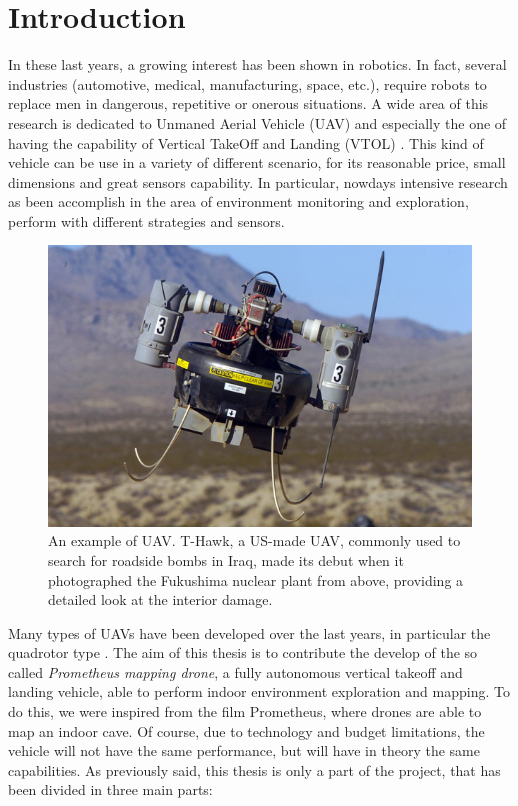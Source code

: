 \chapter{Introduction}
\label{introduction}

\renewcommand{\thepage}{\arabic{page}} 			%
\setcounter{page}{1}                   			%

In these last years, a growing interest has been shown in robotics. In fact, several industries (automotive, medical, manufacturing, space, etc.), require robots to replace men in dangerous, repetitive or onerous situations. A wide area of this research is dedicated to Unmaned Aerial Vehicle (UAV) and especially the one of having the capability of Vertical TakeOff and Landing (VTOL) \cite{largeQuadrotor}. This kind of vehicle can be use in a variety of different scenario, for its reasonable price, small dimensions and great sensors capability. In particular, nowdays intensive research as been accomplish in the area of environment monitoring and exploration, perform with different strategies and sensors.

\begin{figure}
	\includegraphics[scale=0.4]{images/fukushima.jpg}
	\caption{An example of UAV. T-Hawk, a US-made UAV, commonly used to search for roadside bombs in Iraq, made its debut when it photographed the Fukushima nuclear plant from above, providing a detailed look at the interior damage.}
	\label{fig:application}
\end{figure}  

\noindent Many types of UAVs have been developed over the last years, in particular the quadrotor type \cite{Aalborg}. The aim of this thesis is to contribute the develop of the so called \textit{Prometheus mapping drone}, a fully autonomous vertical takeoff and landing vehicle, able to perform indoor environment exploration and mapping. To do this, we were inspired from the film Prometheus, where drones are able to map an indoor cave. Of course, due to technology and budget limitations, the vehicle will not have the same performance, but will have in theory the same capabilities. As previously said, this thesis is only a part of the project, that has been divided in three main parts:

